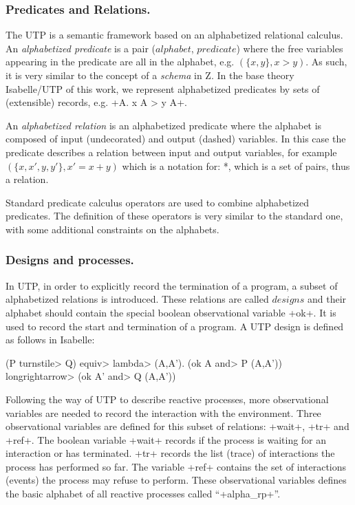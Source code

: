 \documentclass[11pt,a4paper]{article}
\begin{document}
\subsubsection{Predicates and Relations.}
The UTP is a semantic framework based on an alphabetized relational
calculus. An \emph{alphabetized predicate} is a pair ($alphabet$,
$predicate$) where the free variables appearing in the predicate are
all in the alphabet, e.g. $(\{x, y\}, x > y)$. As such, it is very similar to
the concept of a \emph{schema} in Z. In the base theory Isabelle/UTP
of this work, we represent alphabetized predicates  by sets of (extensible) 
records, e.g.  \inlineisar+{A. x A > y A}+. 

An \emph{alphabetized relation} is an alphabetized predicate where the
alphabet is composed of input (undecorated) and output (dashed)
variables. In this case the predicate describes a relation between
input and output variables, for example $(\{x, x', y, y'\}, x' = x + y)$
which is a notation for: *, which is
a set of pairs, thus a relation. 

Standard predicate calculus operators are used to combine alphabetized
predicates. The definition of these operators is very similar to the
standard one, with some additional constraints on the alphabets.

\subsubsection{Designs and processes.}
\label{sec:design-and-processes}
In UTP, in order to explicitly record the termination of a program, a subset
of alphabetized relations is introduced. These relations are called
$designs$ and their alphabet should contain the special boolean
observational variable \inlineisar+ok+. 
It is used to record the start and termination of a program. A UTP design is defined as follows
in Isabelle:
\begin{isar}
    (P \<turnstile> Q) \<equiv>  \<lambda> (A,A'). (ok A \<and>   P (A,A')) \<longrightarrow>  (ok A' \<and>  Q (A,A')) 
\end{isar}
Following the way of UTP to describe reactive processes,
more observational variables are needed to record the interaction %
with the environment. Three observational variables are defined for this subset
of relations: \inlineisar+wait+, \inlineisar+tr+ and \inlineisar+ref+. The boolean variable \inlineisar+wait+
records if the process is waiting for an interaction or has
terminated. \inlineisar+tr+ records the list (trace) of interactions
the process has performed so far. The variable \inlineisar+ref+ contains the set
of interactions (events) the process may refuse to perform. These observational variables defines the basic alphabet of all reactive processes called ``\inlineisar+alpha_rp+''.
\end{document}
